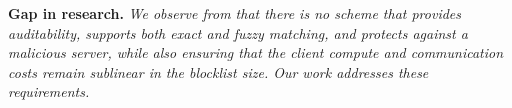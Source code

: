 \noindent\textbf{Gap in research.}
%
\emph{We observe from  that there is no scheme that provides auditability, supports both exact and fuzzy matching, and protects against a malicious server, while also ensuring that the client compute and communication costs remain sublinear in the blocklist size. Our work addresses these requirements.} 
